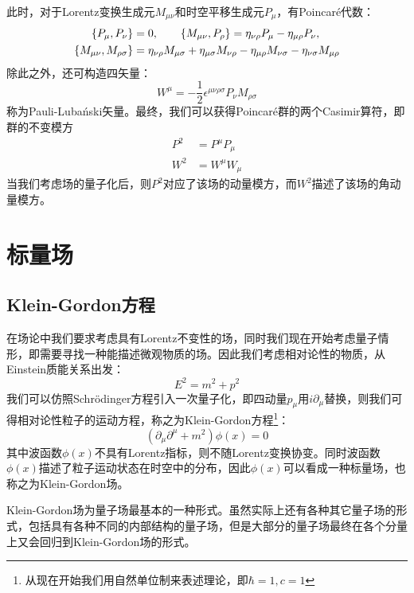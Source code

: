 此时，对于Lorentz变换生成元$M_{\mu\nu}$和时空平移生成元$P_\mu$，有Poincar\'e代数：
\begin{align}
	\{P_\mu,P_\nu\}&=0,\qquad\{M_{\mu\nu},P_\rho\}=\eta_{\nu\rho}P_\mu-\eta_{\mu\rho}P_\nu,\notag\\
	\{M_{\mu\nu},M_{\rho\sigma}\}&=\eta_{\nu\rho}M_{\mu\sigma}+\eta_{\mu\sigma}M_{\nu\rho}-\eta_{\mu\rho}M_{\nu\sigma}-\eta_{\nu\sigma}M_{\mu\rho}
\end{align}
除此之外，还可构造四矢量：
\begin{equation}
	W^\mu=-\frac{1}{2}\epsilon^{\mu\nu\rho\sigma}P_\nu M_{\rho\sigma}
\end{equation}
称为Pauli-Lubański矢量。最终，我们可以获得Poincar\'e群的两个Casimir算符，即群的不变模方
\begin{align}
    P^2 &= P^\mu P_\mu\\
    W^2 &= W^\mu W_\mu
\end{align}
当我们考虑场的量子化后，则$P^2$对应了该场的动量模方，而$W^2$描述了该场的角动量模方。
\chapter{标量场}
\section{Klein-Gordon方程}
在场论中我们要求考虑具有Lorentz不变性的场，同时我们现在开始考虑量子情形，即需要寻找一种能描述微观物质的场。因此我们考虑相对论性的物质，从Einstein质能关系出发：
\begin{equation}
E^2=m^2+p^2
\end{equation}
我们可以仿照Schr\"odinger方程引入一次量子化，即四动量$p_\mu$用$i\partial_\mu$替换，则我们可得相对论性粒子的运动方程，称之为Klein-Gordon方程\footnote{从现在开始我们用自然单位制来表述理论，即$\hbar=1,c=1$}：
\begin{equation}
\left(\partial_\mu\partial^\mu+m^2\right)\phi(x)=0
\end{equation}
其中波函数$\phi(x)$不具有Lorentz指标，则不随Lorentz变换协变。同时波函数$\phi(x)$描述了粒子运动状态在时空中的分布，因此$\phi(x)$可以看成一种标量场，也称之为Klein-Gordon场。

Klein-Gordon场为量子场最基本的一种形式。虽然实际上还有各种其它量子场的形式，包括具有各种不同的内部结构的量子场，但是大部分的量子场最终在各个分量上又会回归到Klein-Gordon场的形式。
